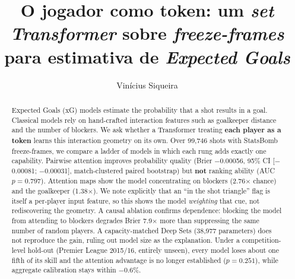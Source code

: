 \documentclass[12pt]{article}
\title{O jogador como token: um \emph{set Transformer} sobre \emph{freeze-frames}
       para estimativa de \emph{Expected Goals}}
\author{Vinícius Siqueira\inst{1}}
\begin{document}
\maketitle

\begin{abstract}
Expected Goals (xG) models estimate the probability that a shot results in a
goal. Classical models rely on hand-crafted interaction features such as
goalkeeper distance and the number of blockers. We ask whether a Transformer
treating \textbf{each player as a token} learns this interaction geometry on its
own. Over 99{,}746 shots with StatsBomb freeze-frames, we compare a ladder of
models in which each rung adds exactly one capability. Pairwise attention
improves probability quality (Brier $-$0.00056, 95\% CI [$-$0.00081; $-$0.00031],
match-clustered paired bootstrap) but \textbf{not} ranking ability (AUC
$p = 0.797$). Attention maps show the model concentrating on blockers
(2.76$\times$ chance) and the goalkeeper (1.38$\times$). We note explicitly that
an ``in the shot triangle'' flag is itself a per-player input feature, so this
shows the model \emph{weighting} that cue, not rediscovering the geometry. A
causal ablation confirms dependence: blocking the model from attending to
blockers degrades Brier 7.9$\times$ more than suppressing the same number of
random players. A capacity-matched Deep Sets (38{,}977 parameters) does not
reproduce the gain, ruling out model size as the explanation. Under a
competition-level hold-out (Premier League 2015/16, entirely unseen), every
model loses about one fifth of its skill and the attention advantage is no
longer established ($p = 0.251$), while aggregate calibration stays within
$-$0.6\%.
\end{abstract}
\end{document}
